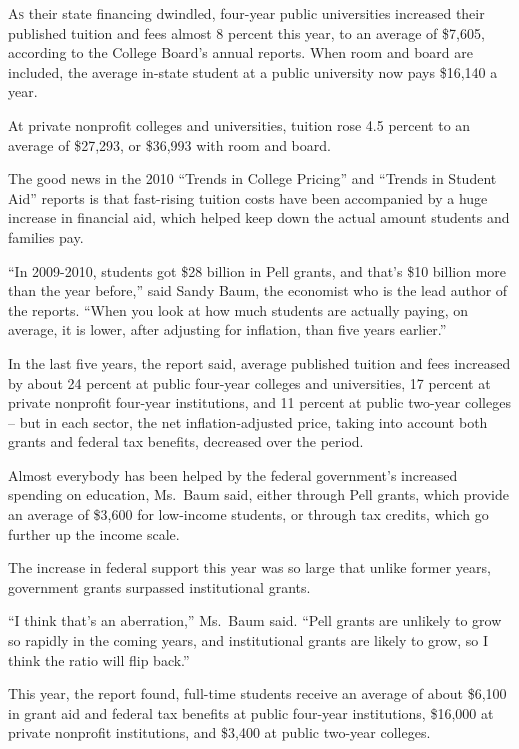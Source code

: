﻿\documentclass[12pt]{article}
\begin{document}
\lettrine{A}{s} their state financing dwindled, four-year public
universities increased their published tuition and fees almost 8 percent this year, to an average of
\$7,605, according to the College Board's annual reports. When room and board are included, the
average in-state student at a public university now pays \$16,140 a year.

At private nonprofit colleges and universities, tuition rose 4.5 percent to an average of \$27,293,
or \$36,993 with room and board.

The good news in the 2010 ``Trends in College Pricing'' and ``Trends in Student Aid'' reports is
that fast-rising tuition costs have been accompanied by a huge increase in financial aid, which
helped keep down the actual amount students and families pay.

``In 2009-2010, students got \$28 billion in Pell grants, and that's \$10 billion more than the year
before,'' said Sandy Baum, the economist who is the lead author of the reports. ``When you look at
how much students are actually paying, on average, it is lower, after adjusting for inflation, than
five years earlier.''

In the last five years, the report said, average published tuition and fees increased by about 24
percent at public four-year colleges and universities, 17 percent at private nonprofit four-year
institutions, and 11 percent at public two-year colleges -- but in each sector, the net
inflation-adjusted price, taking into account both grants and federal tax benefits, decreased over
the period.

Almost everybody has been helped by the federal government's increased spending on education,
Ms.~Baum said, either through Pell grants, which provide an average of \$3,600 for low-income
students, or through tax credits, which go further up the income scale.

The increase in federal support this year was so large that unlike former years, government grants
surpassed institutional grants.

``I think that's an aberration,'' Ms.~Baum said. ``Pell grants are unlikely to grow so rapidly in
the coming years, and institutional grants are likely to grow, so I think the ratio will flip
back.''

This year, the report found, full-time students receive an average of about \$6,100 in grant aid and
federal tax benefits at public four-year institutions, \$16,000 at private nonprofit institutions,
and \$3,400 at public two-year colleges.
\end{document}
